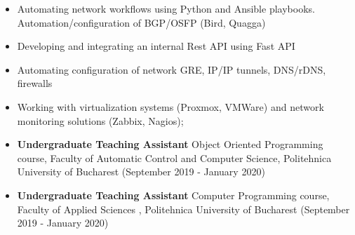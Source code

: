 \documentclass[10pt,a4paper,ragged2e,withhyper]{altacv}
\begin{document}
\begin{paracol}{2}
\divider

\begin{itemize}
\item Automating network workflows using Python and Ansible playbooks. Automation/configuration of BGP/OSFP (Bird, Quagga)
\item Developing and integrating an internal Rest API using Fast API 
\item Automating configuration of network GRE, IP/IP tunnels, \newline DNS/rDNS, firewalls
\item Working with virtualization systems (Proxmox, VMWare) and network monitoring solutions (Zabbix, Nagios);
\end{itemize}

\divider

\medskip

\switchcolumn




\begin{itemize}

\item {\textbf{Undergraduate Teaching Assistant} \newline Object Oriented Programming course, Faculty of Automatic Control and Computer Science, Politehnica University of Bucharest} {(September 2019 - January 2020)}
\item {\textbf{Undergraduate Teaching Assistant} \newline Computer Programming course, Faculty of Applied Sciences , Politehnica University of Bucharest} {(September 2019 - January 2020)}
\end{itemize}
\medskip



\end{paracol}
\end{document}
